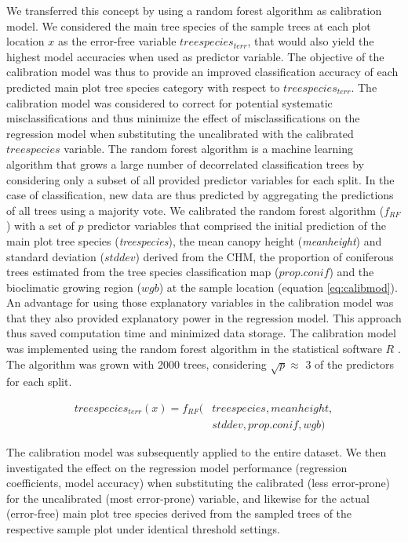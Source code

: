 {	We transferred this concept by using a random forest algorithm \citep{breiman2001} as calibration model. We considered the main tree species of the sample trees at each plot location $x$ as the error-free variable $treespecies_{terr}$, that would also yield the highest model accuracies when used as predictor variable. The objective of the calibration model was thus to provide an improved classification accuracy of each predicted main plot tree species category with respect to $treespecies_{terr}$. The calibration model was considered to correct for potential systematic misclassifications and thus minimize the effect of misclassifications on the regression model when substituting the uncalibrated with the calibrated $treespecies$ variable. The random forest algorithm is a machine learning algorithm that grows a large number of decorrelated classification trees by considering only a subset of all provided predictor variables for each split. In the case of classification, new data are thus predicted by aggregating the predictions of all trees using a majority vote. We calibrated the random forest algorithm ($f_{RF}$) with a set of $p$ predictor variables that comprised the initial prediction of the main plot tree species (\textit{treespecies}), the mean canopy height (\textit{meanheight}) and standard deviation ($stddev$) derived from the CHM, the proportion of coniferous trees estimated from the tree species classification map ($prop.conif$) and the bioclimatic growing region ($wgb$) at the sample location (equation \ref{eq:calibmod}). An advantage for using those explanatory variables in the calibration model was that they also provided explanatory power in the regression model. This approach thus saved computation time and minimized data storage. The calibration model was implemented using the random forest algorithm \citep{liaw2002} in the statistical software $R$ \citep{R}. The algorithm was grown with 2000 trees, considering $\sqrt{p} \approx$ 3 of the predictors for each split.\par
	
	\begin{equation} \label{eq:calibmod}
	\begin{split}
	treespecies_{terr}(x) = f_{RF}(&treespecies, meanheight, \\
	&stddev, prop.conif, wgb)
	\end{split}
	\end{equation}
	
	The calibration model was subsequently applied to the entire dataset. We then investigated the effect on the regression model performance (regression coefficients, model accuracy) when substituting the calibrated (less error-prone) for the uncalibrated (most error-prone) variable, and likewise for the actual (error-free) main plot tree species derived from the sampled trees of the respective sample plot under identical threshold settings.\par
	
}

